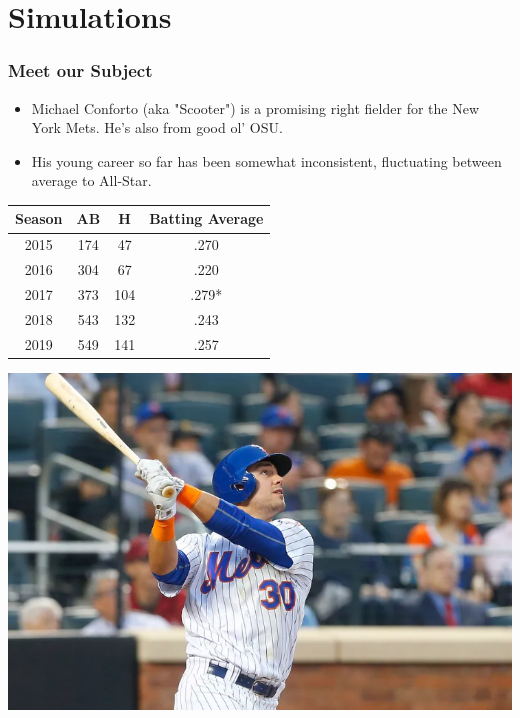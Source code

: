 \documentclass{beamer}
\begin{document}
\section{Simulations}
\begin{frame}
	\frametitle{Meet our Subject}
	\begin{itemize}
		\item Michael  Conforto (aka "Scooter") is a promising right fielder for the New York Mets. He's also from good ol' OSU.
		\item His young career so far has been somewhat inconsistent, fluctuating between average to All-Star.\cite{baseballreference}
	\end{itemize}
	\vspace{.5cm}
	\begin{minipage}{.6\textwidth}
		\begin{center}
		\begin{tabular}{|| c | c | c|  c ||}
			\hline
			Season & AB & H & Batting Average \\
			\hline
			2015 & 174 & 47 & .270 \\
			2016 & 304 & 67 & .220 \\
			2017 & 373 & 104 & .279* \\
			2018 & 543 & 132 & .243 \\
			2019 & 549 & 141 & .257 \\
			\hline
		\end{tabular}
		\end{center}
	\end{minipage}
	\begin{minipage}{.38\textwidth}
		\begin{center}
		\includegraphics[width=.95\textwidth]{scooter}
		\end{center}
	\end{minipage}
\end{frame}
\end{document}
